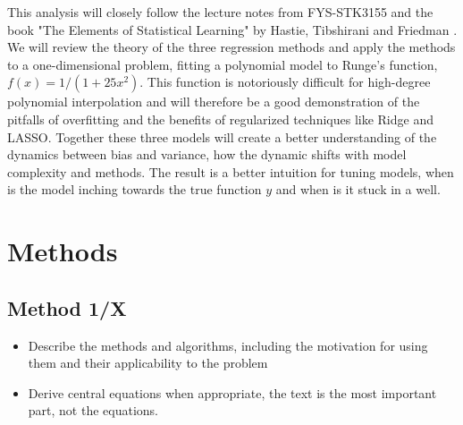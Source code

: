 \documentclass[amssymb,twocolumn,aps]{revtex4}
\begin{document}
This analysis will closely follow the lecture notes from FYS-STK3155 \cite{compfys} and the book "The Elements of Statistical Learning" by Hastie, Tibshirani and Friedman \cite{hastie}.
We will review the theory of the three regression methods and apply the methods to a one-dimensional problem, fitting a polynomial model to Runge's function, $f(x)=1/(1+25x^2)$.
This function is notoriously difficult for high-degree polynomial interpolation and will therefore be a good demonstration of the pitfalls of overfitting and the benefits of regularized techniques like Ridge and LASSO.
Together these three models will create a better understanding of the dynamics between bias and variance, how the dynamic shifts with model complexity and methods.
The result is a better intuition for tuning models, when is the model inching towards the true function $y$ and when is it stuck in a well. 

\section{Methods}\label{section:methods}

\subsection{Method 1/X}

\begin{itemize}
    \item Describe the methods and algorithms, including the motivation for using them and their applicability to the problem
    \item Derive central equations when appropriate, the text is the most important part, not the equations.
\end{itemize}
\end{document}
